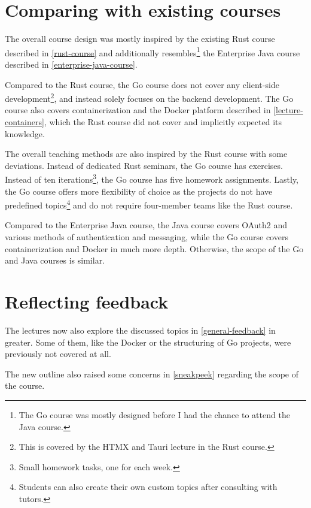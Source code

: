 \documentclass[
  digital,
  color,
  oneside,
  nosansbold,
  nocolorbold,
  lof,
  nolot,
]{fithesis4}
\begin{document}
\section{Comparing with existing courses}\label{reflect-course}

The overall course design was mostly inspired by the existing Rust course described in \cref{rust-course} and additionally resembles\footnote{The Go course was mostly designed before I had the chance to attend the Java course.} the Enterprise Java course described in \cref{enterprise-java-course}.

Compared to the Rust course, the Go course does not cover any client-side development\footnote{This is covered by the HTMX and Tauri lecture in the Rust course.}, and instead solely focuses on the backend development. The Go course also covers containerization and the Docker platform described in \cref{lecture-containers}, which the Rust course did not cover and implicitly expected its knowledge. 

The overall teaching methods are also inspired by the Rust course with some deviations. Instead of dedicated Rust seminars, the Go course has exercises. Instead of ten iterations\footnote{Small homework tasks, one for each week.}, the Go course has five homework assignments. Lastly, the Go course offers more flexibility of choice as the projects do not have predefined topics\footnote{Students can also create their own custom topics after consulting with tutors.} and do not require four-member teams like the Rust course.

Compared to the Enterprise Java course, the Java course covers OAuth2 and various methods of authentication and messaging, while the Go course covers containerization and Docker in much more depth. Otherwise, the scope of the Go and Java courses is similar.

\section{Reflecting feedback}\label{reflect-feedback}

The lectures now also explore the discussed topics in \cref{general-feedback} in greater. Some of them, like the Docker or the structuring of Go projects, were previously not covered at all.

The new outline also raised some concerns in \cref{sneakpeek} regarding the scope of the course. 
\end{document}
